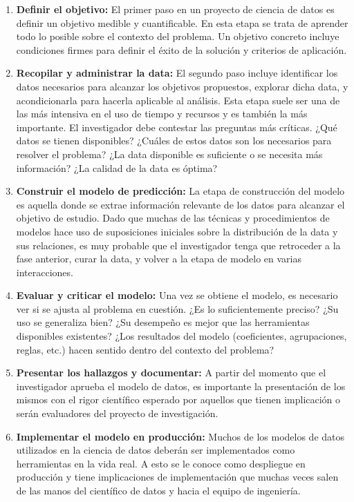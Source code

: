 \begin{enumerate}
	\item \textbf{Definir el objetivo:} El primer paso en un proyecto de ciencia de datos es definir un objetivo medible y cuantificable. En esta etapa se trata de aprender todo lo posible sobre el contexto del problema. Un objetivo concreto incluye condiciones firmes para definir el éxito de la solución y criterios de aplicación.  
	\item \textbf{Recopilar y administrar la data:} El segundo paso incluye identificar los datos necesarios para alcanzar los objetivos propuestos, explorar dicha data, y acondicionarla para hacerla aplicable al análisis. Esta etapa suele ser una de las más intensiva en el uso de tiempo y recursos y es también la más importante. El investigador debe contestar las preguntas más críticas. ¿Qué datos se tienen disponibles? ¿Cuáles de estos datos son los necesarios para resolver el problema? ¿La data disponible es suficiente o se necesita más información? ¿La calidad de la data es óptima?
	\item \textbf{Construir el modelo de predicción:} La etapa de construcción del modelo es aquella donde se extrae información relevante de los datos para alcanzar el objetivo de estudio. Dado que muchas de las técnicas y procedimientos de modelos hace uso de suposiciones iniciales sobre la distribución de la data y sus relaciones, es muy probable que el investigador tenga que retroceder a la fase anterior, curar la data, y volver a la etapa de modelo en varias interacciones. 
	\item \textbf{Evaluar y criticar el modelo:} Una vez se obtiene el modelo, es necesario ver si se ajusta al problema en cuestión. ¿Es lo suficientemente preciso? ¿Su uso se generaliza bien? ¿Su desempeño es mejor que las herramientas disponibles existentes? ¿Los resultados del modelo (coeficientes, agrupaciones, reglas, etc.) hacen sentido dentro del contexto del problema?    
	\item \textbf{Presentar los hallazgos y documentar:} A partir del momento que el investigador aprueba el modelo de datos, es importante la presentación de los mismos con el rigor científico esperado por aquellos que tienen implicación o serán evaluadores del proyecto de investigación. 
	\item \textbf{Implementar el modelo en producción:} Muchos de los modelos de datos utilizados en la ciencia de datos deberán ser implementados como herramientas en la vida real. A esto se le conoce como despliegue en producción y tiene implicaciones de implementación que muchas veces salen de las manos del científico de datos y hacia el equipo de ingeniería. 
\end{enumerate}

